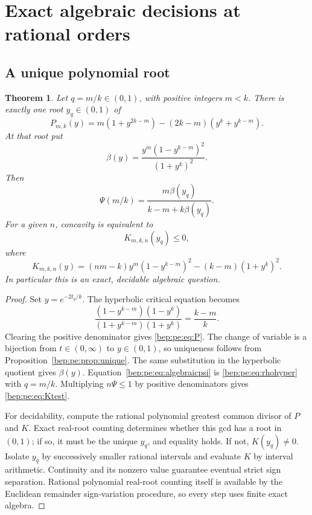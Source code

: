 \documentclass[11pt]{article}
\numberwithin{equation}{section}
\newtheorem{theorem}{Theorem}[section]
\theoremstyle{definition}
\theoremstyle{remark}
\begin{document}
\section{Exact algebraic decisions at rational orders}\label{bep:pe:sec:algebraic}
\subsection{A unique polynomial root}
\begin{theorem}\label{bep:pe:thm:algebraic}
Let $q=m/k\in(0,1)$, with positive integers $m<k$. There is exactly one
root $y_q\in(0,1)$ of
\begin{equation}
 P_{m,k}(y)=m(1+y^{2k-m})-(2k-m)(y^k+y^{k-m}).
 \label{bep:pe:eq:P}
\end{equation}
At that root put
\begin{equation}
 \beta(y)=\frac{y^m(1-y^{k-m})^2}{(1+y^k)^2}.
\end{equation}
Then
\begin{equation}
 \Psi(m/k)=\frac{m\beta(y_q)}{k-m+k\beta(y_q)}.
 \label{bep:pe:eq:algebraicpsi}
\end{equation}
For a given $n$, concavity is equivalent to
\begin{equation}
 K_{m,k,n}(y_q)\leq0,\label{bep:pe:eq:Ktest}
\end{equation}
where
\begin{equation}
 K_{m,k,n}(y)=(nm-k)y^m(1-y^{k-m})^2
 -(k-m)(1+y^k)^2.\label{bep:pe:eq:K}
\end{equation}
In particular this is an exact, decidable algebraic question.
\end{theorem}
\begin{proof}
Set $y=e^{-2t_q/k}$. The hyperbolic critical equation becomes
\[
 \frac{(1-y^{k-m})(1-y^k)}{(1+y^{k-m})(1+y^k)}=\frac{k-m}{k}.
\]
Clearing the positive denominator gives \eqref{bep:pe:eq:P}.
The change of variable is a bijection from $t\in(0,\infty)$ to
$y\in(0,1)$, so uniqueness follows from Proposition~\ref{bep:pe:prop:unique}.
The same substitution in the hyperbolic quotient gives $\beta(y)$.
Equation~\eqref{bep:pe:eq:algebraicpsi} is \eqref{bep:pe:eq:rhohyper} with
$q=m/k$. Multiplying $n\Psi\leq1$ by positive denominators gives
\eqref{bep:pe:eq:Ktest}.

For decidability, compute the rational polynomial greatest common
divisor of $P$ and $K$. Exact real-root counting determines whether
this gcd has a root in $(0,1)$; if so, it must be the unique $y_q$,
and equality holds. If not, $K(y_q)\ne0$. Isolate $y_q$ by successively
smaller rational intervals and evaluate $K$ by interval arithmetic.
Continuity and its nonzero value guarantee eventual strict sign
separation. Rational polynomial real-root counting itself is available
by the Euclidean remainder sign-variation procedure, so every step
uses finite exact algebra.
\end{proof}
\end{document}
